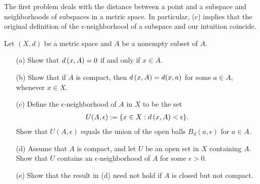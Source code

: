 The first problem deals with the distance between a point and a subspace and neighborhoods of subspaces in a metric space.
In particular, (c) implies that the original definition of the $\epsilon$-neighborhood of a subspace and our intuition coincide.
\begin{prob}
    Let $(X, d)$ be a metric space and $A$ be a nonempty subset of $A$.
    \begin{enumerate}
        \item[(a)]
        {
            Show that ${d}\left({x},{A}\right)=0$ if and only if $x\in\overline{A}$.
        }
        \item[(b)]
        {
            Show that if $A$ is compact, then ${d}\left({x},{A}\right)=d(x, a)$ for some $a\in A$, whenever $x\in X$.
        }
        \item[(c)]
        {
            Define the $\epsilon$-neighborhood of $A$ in $X$ to be the set
                \begin{align*}
                    U(A, \epsilon):=\{x\in X:{d}\left({x},{A}\right)<\epsilon\}.
                \end{align*}
            Show that $U(A, \epsilon)$ equals the union of the open balls $B_d(a, \epsilon)$ for $a\in A$.
        }
        \item[(d)]
        {
            Assume that $A$ is compact, and let $U$ be an open set in $X$ containing $A$.
            Show that $U$ contains an $\epsilon$-neighborhood of $A$ for some $\epsilon>0$.
        }
        \item[(e)]
        {
            Show that the result in (d) need not hold if $A$ is closed but not compact.
        }
    \end{enumerate}
\end{prob}
